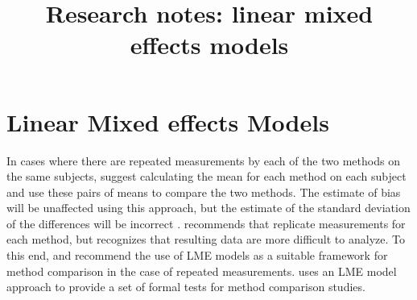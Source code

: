 \documentclass[12pt, a4paper]{report}
\title{Research notes: linear mixed effects models}
\author{ } \date{ }
\theoremstyle{plain}
\theoremstyle{definition}
\theoremstyle{remark}
\begin{document}
	\tableofcontents

	
%	
%	

			\chapter{Linear Mixed effects Models}


In cases where there are repeated measurements by each of the two methods on the same subjects, \citet{BA99} suggest calculating
the mean for each method on each subject and use these pairs of means to compare the two methods. The estimate of bias will be unaffected using this approach, but the estimate of the standard deviation of the differences will be incorrect \citep{BXC2004}. \citet{BXC2004} recommends that replicate measurements for each method, but recognizes that resulting data are more difficult to analyze. To this end, \citet{BXC2004} and \citet{BXC2008} recommend the use of LME models as a suitable framework for method comparison in the case of repeated measurements.
\citet{ARoy2009} uses an LME model approach to provide a set of formal tests for method comparison studies.
\end{document}
